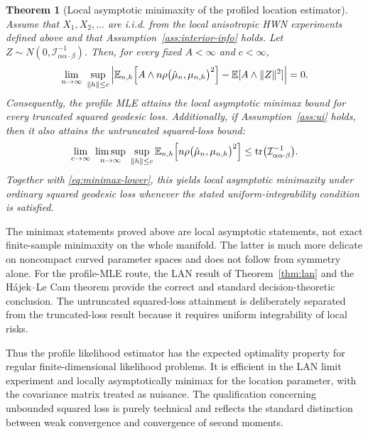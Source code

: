 \documentclass[11pt]{article}
\newtheorem{theorem}{Theorem}[section]
\DeclareMathOperator{\tr}{tr}
\newcommand{\E}{\mathbb{E}}
\newcommand{\info}{\mathcal{I}}
\newcommand{\HajekLecam}{H\'ajek--Le Cam\xspace}
\begin{document}
\begin{theorem}[Local asymptotic minimaxity of the profiled location estimator]
\label{thm:lam-profile}
Assume that $X_1,X_2,\dots$ are i.i.d. from the local anisotropic HWN experiments defined above and that Assumption~\ref{ass:interior-info} holds. Let  $Z\sim N(0,\info_{\alpha\alpha\cdot\beta}^{-1})$. Then, for every fixed $A<\infty$ and $c<\infty$,
\begin{equation}
\label{eq:lam-attain-trunc}
\lim_{n\to\infty}\
\sup_{\|h\|\le c}
\left|
\E_{n,h}\Bigl[A\wedge n\rho\bigl(\hat\mu_n,\mu_{n,h}\bigr)^2\Bigr]
-
\E[A\wedge\|Z\|^2]
\right|=0.
\end{equation}
Consequently, the profile MLE attains the local asymptotic minimax bound for every truncated squared geodesic loss. Additionally, if Assumption~\ref{ass:ui} holds, then it also attains the untruncated squared-loss bound:
\begin{equation}
\label{eq:lam-attain}
\lim_{c\to\infty}\ \limsup_{n\to\infty}\
\sup_{\|h\|\le c}
\E_{n,h}\Bigl[n\rho\bigl(\hat\mu_n,\mu_{n,h}\bigr)^2\Bigr]
\le
\tr\bigl(\info_{\alpha\alpha\cdot\beta}^{-1}\bigr).
\end{equation}
Together with \eqref{eq:minimax-lower}, this yields local asymptotic minimaxity under ordinary squared geodesic loss whenever the stated uniform-integrability condition is satisfied.
\end{theorem}

The minimax statements proved above are local asymptotic statements, not exact finite-sample minimaxity on the whole manifold. The latter is much more delicate on noncompact curved parameter spaces and does not follow from symmetry alone. For the profile-MLE route, the LAN result of Theorem~\ref{thm:lan} and the \HajekLecam theorem provide the correct and standard decision-theoretic conclusion. The untruncated squared-loss attainment is deliberately separated from the truncated-loss result because it requires uniform integrability of local risks.


Thus the profile likelihood estimator has the expected optimality property for regular finite-dimensional likelihood problems. It is efficient in the LAN limit experiment and locally asymptotically minimax for the location parameter, with the covariance matrix treated as nuisance. The qualification concerning unbounded squared loss is purely technical and reflects the standard distinction between weak convergence and convergence of second moments.
\end{document}
